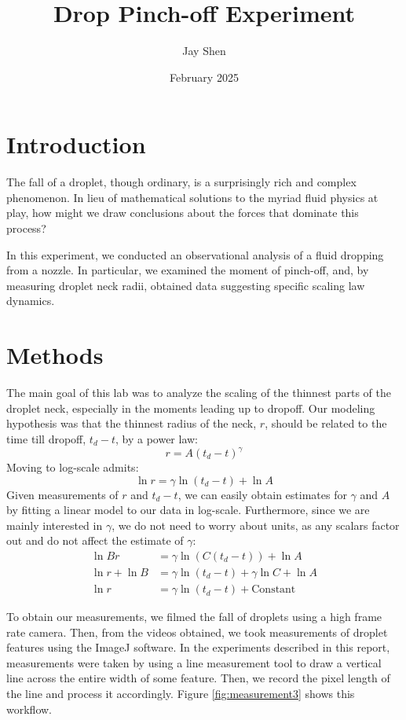 \documentclass[12pt, letterpaper]{article}
\title{Drop Pinch-off Experiment}
\author{Jay Shen}
\date{February 2025}
\begin{document}
\maketitle

\section{Introduction}

The fall of a droplet, though ordinary, is a surprisingly rich and complex phenomenon. In lieu of mathematical solutions to the myriad fluid physics at play, how might we draw conclusions about the forces that dominate this process?

In this experiment, we conducted an observational analysis of a fluid dropping from a nozzle. In particular, we examined the moment of pinch-off, and, by measuring droplet neck radii, obtained data suggesting specific scaling law dynamics. 

\section{Methods}

The main goal of this lab was to analyze the scaling of the thinnest parts of the droplet neck, especially in the moments leading up to dropoff. Our modeling hypothesis was that the thinnest radius of the neck, $r$, should be related to the time till dropoff, $t_d - t$, by a power law: 
\[
    r = A(t_d - t)^\gamma
\]
Moving to log-scale admits:
\[
    \ln r = \gamma \ln (t_d - t) + \ln A
\]
Given measurements of $r$ and $t_d - t$, we can easily obtain estimates for $\gamma$ and $A$ by fitting a linear model to our data in log-scale. Furthermore, since we are mainly interested in $\gamma$, we do not need to worry about units, as any scalars factor out and do not affect the estimate of $\gamma$:
\begin{align*}
    \ln Br &= \gamma \ln (C(t_d - t)) + \ln A \\
    \ln r + \ln B &= \gamma \ln (t_d - t) + \gamma \ln C + \ln A \\
    \ln r &= \gamma \ln (t_d - t) + \text{Constant}
\end{align*}

To obtain our measurements, we filmed the fall of droplets using a high frame rate camera. Then, from the videos obtained, we took measurements of droplet features using the ImageJ software. In the experiments described in this report, measurements were taken by using a line measurement tool to draw a vertical line across the entire width of some feature. Then, we record the pixel length of the line and process it accordingly. Figure \ref{fig:measurement3} shows this workflow. 
\end{document}
